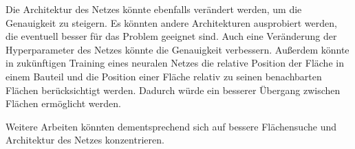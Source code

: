 \smallskip

Die Architektur des Netzes könnte ebenfalls verändert werden, um die Genauigkeit zu steigern. Es könnten andere Architekturen ausprobiert werden, die eventuell besser für das Problem geeignet sind. Auch eine Veränderung der Hyperparameter des Netzes könnte die Genauigkeit verbessern.
Außerdem könnte in zukünftigen Training eines neuralen Netzes die relative Position der Fläche in einem Bauteil und die Position einer Fläche relativ zu seinen benachbarten Flächen berücksichtigt werden. 
Dadurch würde ein besserer Übergang zwischen Flächen ermöglicht werden.

\smallskip

Weitere Arbeiten könnten dementsprechend sich auf bessere Flächensuche und Architektur des Netzes konzentrieren.
